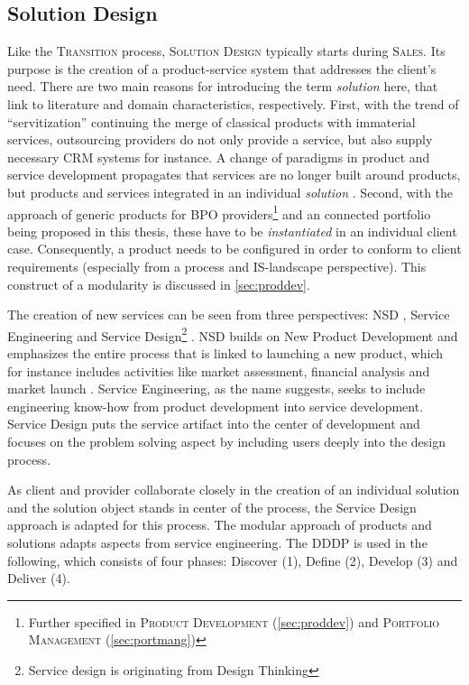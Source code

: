 	\subsection{Solution Design}
	\label{sec:soldef}
	Like the \textsc{Transition} process, \textsc{Solution Design} typically starts during \textsc{Sales}. Its purpose is the creation of a product-service system \citep{Spath2006} that addresses the client's need. There are two main reasons for introducing the term \textit{solution} here, that link to literature and domain characteristics, respectively. First, with the trend of \enquote{servitization} \citep{servitization} continuing the merge of classical products with immaterial services, outsourcing providers do not only provide a service, but also supply necessary \acrshort{CRM} systems for instance. A change of paradigms in product and service development propagates that services are no longer built around products, but products and services integrated in an individual \textit{solution} \citep[]{Spath2006}.
	Second, with the approach of generic products for \acrshort{BPO} providers\footnote{Further specified in \textsc{Product Development} (\ref{sec:proddev}) and \textsc{Portfolio Management} (\ref{sec:portmang})} and an connected portfolio being proposed in this thesis, these have to be \textit{instantiated} in an individual client case. Consequently, a product needs to be configured in order to conform to client requirements (especially from a process and  \acrshort{IS}-landscape perspective). This construct of a modularity is discussed in \ref{sec:proddev}. 
	
	The creation of new services can be seen from three perspectives: \acrfull{NSD} \citep{cowell1988new}, Service Engineering \citep{9783540253242} and Service Design\footnote{Service design is originating from Design Thinking} \citep{rowe1987design}. \acrshort{NSD} builds on New Product Development and emphasizes the entire process that is linked to launching a new product, which for instance includes activities like market assessment, financial analysis and market launch \citep{cooper1988new}. Service Engineering, as the name suggests, seeks to include engineering know-how from product development into service development. Service Design puts the service artifact into the center of development and focuses on the problem solving aspect by including users deeply into the design process. 
	
	As client and provider collaborate closely in the creation of an individual solution and the solution object stands in center of the process, the Service Design approach is adapted for this process. The modular approach of products and solutions adapts aspects from service engineering. The \acrfull{DDDP} \citep{dcdd} is used in the following, which consists of four phases: Discover (1), Define (2), Develop (3) and Deliver (4).
	
